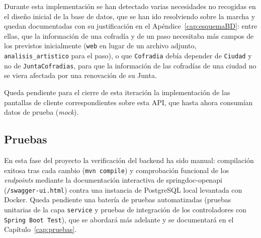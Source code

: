 Durante esta implementación se han detectado varias necesidades no recogidas en el diseño inicial de la base de datos, que se han ido resolviendo sobre la marcha y quedan documentadas con su justificación en el Apéndice~\ref{cap:esquemaBD}: entre ellas, que la información de una cofradía y de un paso necesitaba más campos de los previstos inicialmente (\texttt{web} en lugar de un archivo adjunto, \texttt{analisis\_artistico} para el paso), o que \texttt{Cofradia} debía depender de \texttt{Ciudad} y no de \texttt{JuntaCofradias}, para que la información de las cofradías de una ciudad no se viera afectada por una renovación de su Junta.

Queda pendiente para el cierre de esta iteración la implementación de las pantallas de cliente correspondientes sobre esta API, que hasta ahora consumían datos de prueba (\emph{mock}).


\subsection{Pruebas}

En esta fase del proyecto la verificación del backend ha sido manual: compilación exitosa tras cada cambio (\texttt{mvn compile}) y comprobación funcional de los \emph{endpoints} mediante la documentación interactiva de springdoc-openapi (\texttt{/swagger-ui.html}) contra una instancia de PostgreSQL local levantada con Docker. Queda pendiente una batería de pruebas automatizadas (pruebas unitarias de la capa \texttt{service} y pruebas de integración de los controladores con \texttt{Spring Boot Test}), que se abordará más adelante y se documentará en el Capítulo~\ref{cap:pruebas}.